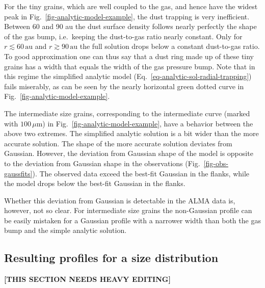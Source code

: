 \documentclass{aa}
\begin{document}
For the tiny grains, which are well coupled to the gas, and hence have the
widest peak in Fig.~\ref{fig-analytic-model-example}, the dust trapping is very
inefficient. Between 60 and 90 au the dust surface density follows nearly
perfectly the shape of the gas bump, i.e.\ keeping the dust-to-gas ratio nearly
constant. Only for $r\lesssim 60\,\mathrm{au}$ and $r\gtrsim 90\,\mathrm{au}$
the full solution drops below a constant dust-to-gas ratio. To good approximation
one can thus say that a dust ring made up of these tiny grains has a width
that equals the width of the gas pressure bump. Note that in this regime the
simplified analytic model (Eq.~\ref{eq-analytic-sol-radial-trapping}) fails
miserably, as can be seen by the nearly horizontal green dotted curve in
Fig.~\ref{fig-analytic-model-example}.

The intermediate size grains, corresponding to the intermediate curve (marked
with $100\,\mu\mathrm{m}$) in Fig.~\ref{fig-analytic-model-example}, have a
behavior between the above two extremes. The simplified analytic solution is a
bit wider than the more accurate solution. The shape of the more accurate
solution deviates from Gaussian. However, the deviation from Gaussian shape of
the model is opposite to the deviation from Gaussian shape in the observations
(Fig.~\ref{fig-obs-gaussfits}). The observed data exceed the best-fit Gaussian
in the flanks, while the model drops below the best-fit Gaussian in the flanks.

Whether this deviation from Gaussian is detectable in the ALMA data is,
however, not so clear. For intermediate size grains the non-Gaussian profile
can be easily mistaken for a Gaussian profile with a narrower width than
both the gas bump and the simple analytic solution. 







\subsection{Resulting profiles for a size distribution}
\label{sec-anmodel-profiles}
%

{\bf [THIS SECTION NEEDS HEAVY EDITING]}
\end{document}
